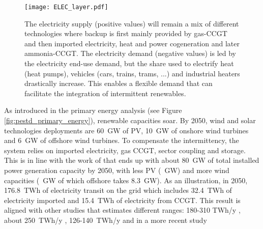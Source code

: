 \begin{figure}[!htbp]
     \centering
         \texttt{[image: ELEC\_layer.pdf]}
         \caption{The electricity supply (positive values) will remain a mix of different technologies where backup is first mainly provided by gas-\gls{CCGT} and then imported electricity, heat and power cogeneration and later ammonia-\gls{CCGT}. The electricity demand (negative values) is led by the electricity end-use demand, but the share used to electrify heat (heat pumps), vehicles (cars, trains, trams, ...) and industrial heaters drastically increase. This enables a flexible demand that can facilitate the integration of intermittent renewables.}
         \label{fig:ELEC_layer}
\end{figure}

As introduced in the primary energy analysis (see Figure \ref{fig:pestd_primary_energy}), renewable capacities soar. By 2050, wind and solar technologies deployments are 60~GW of \gls{PV}, 10~GW of onshore wind turbines and 6~GW of offshore wind turbines. To compensate the intermittency, the system relies on imported electricity, gas \gls{CCGT}, sector coupling and storage. This is in line with the work of \citet{Devogelaer2020} that ends up with about 80~GW of total installed power generation capacity by 2050, with less \gls{PV} (~GW) and more wind capacities (~GW of which offshore takes 8.3~GW). As an illustration, in 2050, 176.8~TWh of electricity transit on the grid which includes 32.4~TWh of electricity imported and 15.4~TWh of electricity from \gls{CCGT}. This result is aligned with other studies that estimates different ranges: 180-310 TWh/y \cite{Devogelaer2013}, about 250~TWh/y \cite{Devogelaer2020}, 126-140~TWh/y \cite{My2050} and in a more recent study 
